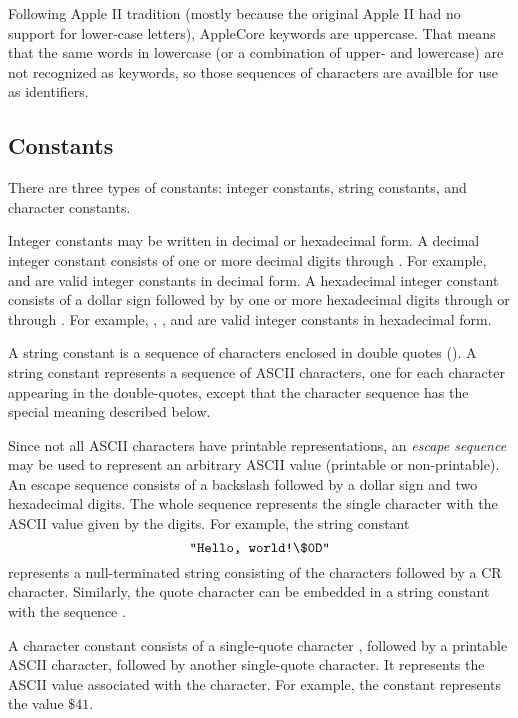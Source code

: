 \documentclass[10pt]{article}
\begin{document}
Following Apple II tradition (mostly because the original Apple II had
no support for lower-case letters), AppleCore keywords are uppercase.
That means that the same words in lowercase (or a combination of
upper- and lowercase) are not recognized as keywords, so those
sequences of characters are availble for use as identifiers.

\subsection{Constants}
\label{sec:lexical:constants}

There are three types of constants: integer constants, string
constants, and character constants.  

  Integer constants may be written in
decimal or hexadecimal form.  A decimal integer constant consists of
one or more decimal digits  through .  For example,
 and  are valid integer constants in decimal form.  A
hexadecimal integer constant consists of a dollar sign \kwd{\$}
followed by by one or more hexadecimal digits  through 
or  through .  For example, , , and
 are valid integer constants in hexadecimal form.

 A string constant is a sequence of
characters enclosed in double quotes ().  A string constant
represents a sequence of ASCII characters, one for each character
appearing in the double-quotes, except that the character sequence
\kwd{\bs\$} has the special meaning described below.

Since not all ASCII characters have printable representations, an
\emph{escape sequence} may be used to represent an arbitrary ASCII
value (printable or non-printable).  An escape sequence consists of a
backslash \kwd{\bs} followed by a dollar sign \kwd{\$} and two
hexadecimal digits.  The whole sequence represents the single
character with the ASCII value given by the digits.  For example, the
string constant
%
$$\texttt{"Hello, world!\textbackslash\$0D"}$$
%
represents a null-terminated string consisting of the characters
 followed by a CR character.  Similarly, the quote
character  can be embedded in a string constant with the
sequence .

 A character constant consists of a
single-quote character , followed by a printable ASCII
character, followed by another single-quote character.  It represents
the ASCII value associated with the character.  For example, the
constant  represents the value $\$41$.
\end{document}
